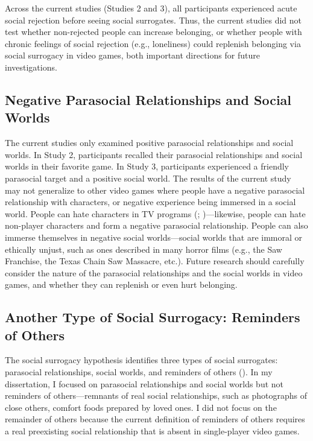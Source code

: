 \documentclass[
]{udthesis}
\begin{document}
Across the current studies (Studies 2 and 3), all participants
experienced acute social rejection before seeing social surrogates.
Thus, the current studies did not test whether non-rejected people can
increase belonging, or whether people with chronic feelings of social
rejection (e.g., loneliness) could replenish belonging via social
surrogacy in video games, both important directions for future
investigations.

\subsection{Negative Parasocial Relationships and Social Worlds}\label{negative-parasocial-relationships-and-social-worlds}

The current studies only examined positive parasocial relationships and
social worlds. In Study 2, participants recalled their parasocial
relationships and social worlds in their favorite game. In Study 3,
participants experienced a friendly parasocial target and a positive
social world. The results of the current study may not generalize to
other video games where people have a negative parasocial relationship
with characters, or negative experience being immersed in a social
world. People can hate characters in TV programs (; )---likewise, people can hate non-player characters and
form a negative parasocial relationship. People can also immerse
themselves in negative social worlds---social worlds that are immoral or
ethically unjust, such as ones described in many horror films (e.g., the
Saw Franchise, the Texas Chain Saw Massacre, etc.). Future research
should carefully consider the nature of the parasocial relationships and
the social worlds in video games, and whether they can replenish or even
hurt belonging.

\subsection{Another Type of Social Surrogacy: Reminders of Others}\label{another-type-of-social-surrogacy-reminders-of-others}

The social surrogacy hypothesis identifies three types of social
surrogates: parasocial relationships, social worlds, and reminders of
others (). In my dissertation, I focused on parasocial
relationships and social worlds but not reminders of others---remnants
of real social relationships, such as photographs of close others,
comfort foods prepared by loved ones. I did not focus on the remainder
of others because the current definition of reminders of others requires
a real preexisting social relationship that is absent in single-player
video games.
\end{document}

